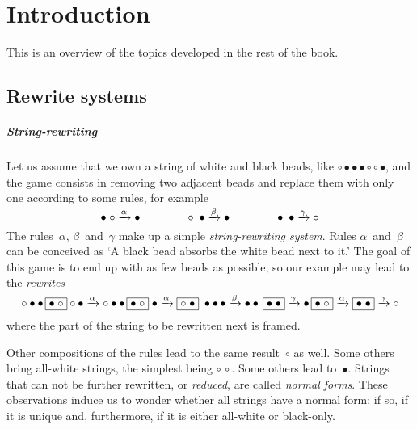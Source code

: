\chapter{Introduction}
\setcounter{page}{1}

This is an overview of the topics developed in the rest of the book.

\section{Rewrite systems}

\paragraph{String-rewriting}

Let us assume that we own a string of white and black beads, like
\(\circ \bullet \bullet \bullet \circ \circ \bullet\), and the
game \citep{VanLeeuwen_1990a,Dershowitz_1993} consists in removing two
adjacent beads and replace them with only one according to some rules,
for example
\begin{equation*}
\bullet \; \circ   \xrightarrow{\smash{\alpha}} \bullet\qquad\qquad
\circ   \; \bullet \xrightarrow{\smash{\beta}} \bullet\qquad\qquad
\bullet \; \bullet \xrightarrow{\smash{\gamma}} \circ
\end{equation*}
The rules~\(\alpha\), \(\beta\)~and~\(\gamma\) make up a simple
\emph{string\hyp{}rewriting system}. Rules
\(\alpha\)~and~\(\beta\) can be conceived as `A black bead absorbs the
white bead next to it.' The goal of this game is to end up with as few
beads as possible, so our example may lead to the \emph{rewrites}
\begin{equation*}
\circ \bullet \bullet \, \fbox{\(\bullet\; \circ\)} \circ \bullet
\xrightarrow{\smash{\alpha}} \circ \bullet \bullet \,
\fbox{\(\bullet\; \circ\)} \; \bullet \xrightarrow{\smash{\alpha}}
\fbox{\(\circ \; \bullet\)} \; \bullet \bullet \,\bullet
\xrightarrow{\smash{\beta}} \bullet \bullet \, \fbox{\(\bullet \;
  \bullet\)} \xrightarrow{\smash{\gamma}} \bullet \, \fbox{\(\bullet
  \; \circ\)} \xrightarrow{\smash{\alpha}} \fbox{\(\bullet \;
  \bullet\)} \xrightarrow{\smash{\gamma}} \circ
\end{equation*}
where the part of the string to be rewritten next is framed.

Other compositions of the rules lead to the same result~\(\circ\) as
well. Some others bring all\hyp{}white strings, the simplest being
\(\circ \, \circ\). Some others lead to~\(\bullet\). Strings that can
not be further rewritten, or \emph{reduced}, are called \emph{normal
  forms}. These observations induce
us to wonder whether all strings have a normal form; if so, if it is
unique and, furthermore, if it is either all\hyp{}white or
black\hyp{}only.

